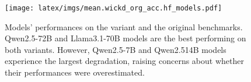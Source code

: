 \begin{figure}[th!]
\centering
\texttt{[image: latex/imgs/mean.wickd\_org\_acc.hf\_models.pdf]}
\caption{Models' performances on the \wicd\space variant and the original benchmarks. Qwen2.5-72B and Llama3.1-70B models are the best performing on both variants. However, Qwen2.5-7B and Qwen2.514B models experience the largest degradation, raising concerns about whether their performances were overestimated.}
\label{fig:main-res}
\end{figure} 
